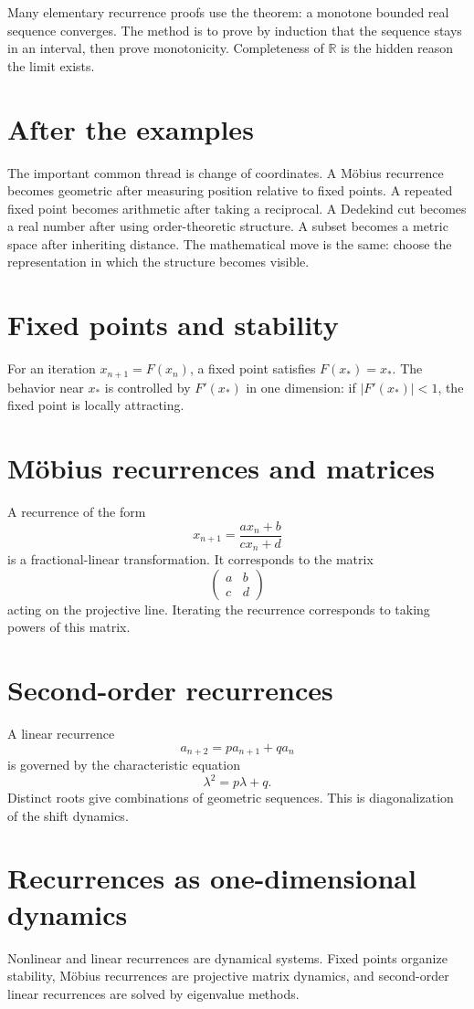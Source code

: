 Many elementary recurrence proofs use the theorem: a monotone bounded real sequence converges.  The method is to prove by induction that the sequence stays in an interval, then prove monotonicity.  Completeness of \(\mathbb R\) is the hidden reason the limit exists.

\section{After the examples}

The important common thread is change of coordinates.  A Möbius recurrence becomes geometric after measuring position relative to fixed points.  A repeated fixed point becomes arithmetic after taking a reciprocal.  A Dedekind cut becomes a real number after using order-theoretic structure.  A subset becomes a metric space after inheriting distance.  The mathematical move is the same: choose the representation in which the structure becomes visible.

\section{Fixed points and stability}

For an iteration \(x_{n+1}=F(x_n)\), a fixed point satisfies \(F(x_*)=x_*\).  The behavior near \(x_*\) is controlled by \(F'(x_*)\) in one dimension: if \(|F'(x_*)|<1\), the fixed point is locally attracting.

\section{Möbius recurrences and matrices}

A recurrence of the form
\[
  x_{n+1}=\frac{ax_n+b}{cx_n+d}
\]
is a fractional-linear transformation.  It corresponds to the matrix
\[
  \begin{pmatrix}a&b\\c&d\end{pmatrix}
\]
acting on the projective line.  Iterating the recurrence corresponds to taking powers of this matrix.

\section{Second-order recurrences}

A linear recurrence
\[
  a_{n+2}=pa_{n+1}+qa_n
\]
is governed by the characteristic equation
\[
  \lambda^2=p\lambda+q.
\]
Distinct roots give combinations of geometric sequences.  This is diagonalization of the shift dynamics.

\section{Recurrences as one-dimensional dynamics}

Nonlinear and linear recurrences are dynamical systems.  Fixed points organize stability, Möbius recurrences are projective matrix dynamics, and second-order linear recurrences are solved by eigenvalue methods.
